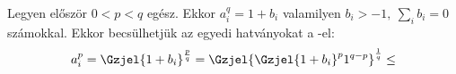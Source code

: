 Legyen először $0<p<q$ egész. Ekkor $a_i^q=1+b_i$ valamilyen $b_i>-1, \ \sum_i b_i = 0$ számokkal.
Ekkor becsülhetjük az egyedi hatványokat a -el:
\begin{align*}
a_i^p = \Gzjel{ 1 + b_i }^{ \frac{p}{q} } = \Gzjel{\Gzjel{ 1 + b_i }^p 1^{q-p} }^{ \frac{1}{q} } \le \\
\end{align*}
